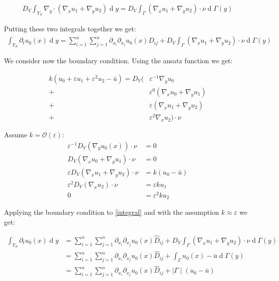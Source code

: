 \documentclass[10pt, a4paper]{article}
\begin{document}
 \begin{align}
 \label{divergence theorem}
 D_V \int_{Y_S} \nabla_y \cdot (\nabla_x u_1 + \nabla_y u_2) \operatorname{d} y = D_V \int_\Gamma (\nabla_x u_1 + \nabla_y u_2) \cdot \nu \operatorname{d} \Gamma(y)
 \end{align}
 
 Putting these two integrals together we get:
 \begin{align}
 \label{integral}
 \int_{Y_S}\partial_t u_0(x)\operatorname{d}y = \sum_{i=1}^n\sum_{j=1}^n \partial_{x_i}\partial_{x_j}u_0(x) \hat D_{ij}+D_V \int_\Gamma (\nabla_x u_1 + \nabla_y u_2) \cdot \nu \operatorname{d} \Gamma(y)
 \end{align}

 We consider now the boundary condition. Using the ansatz function we get:
 
 \begin{align*}
k(u_0 + \varepsilon u_1 + \varepsilon^2 u_2 - \bar{u}) = D_V(&\varepsilon^{-1} \nabla_y u_0 \\
+& \varepsilon^0(\nabla_x u_0 + \nabla_y u_1)\\
+& \varepsilon ( \nabla_x u_1 + \nabla_y u_2)\\
+& \varepsilon^2 \nabla_x u_2) \cdot \nu
\end{align*}

Assume $k = \mathcal{O}(\varepsilon)$:
\begin{align}
 \varepsilon^{-1}D_V(\nabla_y u_0(x)) \cdot \nu &= 0\\
  D_V(\nabla_x u_0 + \nabla_y u_1) \cdot \nu &= 0\\
   \varepsilon D_V(\nabla_x u_1 + \nabla_y u_2) \cdot \nu&= k(u_0- \bar{u}) \\
   \varepsilon^2 D_V(\nabla_x u_2) \cdot \nu &= \varepsilon k u_1 \\
   0 &= \varepsilon^2 k u_2
\end{align}

Applying the boundary condition to \eqref{integral} and with the assumption $k \approx \varepsilon$ we get:

 \begin{align}
 \label{integral2}
 \int_{Y_S}\partial_t u_0(x)\operatorname{d}y &= \sum_{i=1}^n\sum_{j=1}^n \partial_{x_i}\partial_{x_j}u_0(x) \hat D_{ij}+D_V \int_\Gamma (\nabla_x u_1 + \nabla_y u_2) \cdot \nu \operatorname{d} \Gamma(y)\\
  &= \sum_{i=1}^n\sum_{j=1}^n \partial_{x_i}\partial_{x_j}u_0(x) \hat D_{ij}+\int_\Gamma u_0(x) - \bar{u} \operatorname{d} \Gamma(y)\\
  &= \sum_{i=1}^n\sum_{j=1}^n \partial_{x_i}\partial_{x_j}u_0(x) \hat D_{ij}
  + \mid\Gamma\mid(u_0 - \bar{u})
 \end{align}
\end{document}
